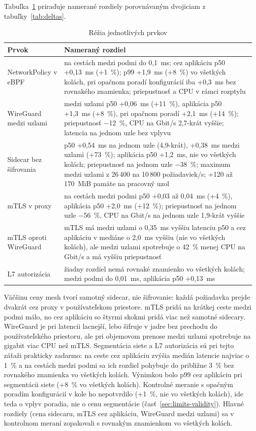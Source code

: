 Tabuľka~\ref{tab:deltas-measured} priraďuje namerané rozdiely porovnávaným dvojiciam z tabuľky~\ref{tab:deltas}.

\begin{table}[ht!]
  \centering
  \caption{Réžia jednotlivých prvkov}
  \label{tab:deltas-measured}
  \footnotesize
  \renewcommand{\arraystretch}{1.15}
  \begin{tabularx}{\textwidth}{@{}>{\raggedright\arraybackslash}p{3.6cm}>{\raggedright\arraybackslash}X@{}}
    \toprule
    Prvok & Nameraný rozdiel \\
    \midrule
    NetworkPolicy v eBPF & na cestách medzi podmi do 0,1~ms; cez aplikáciu p50 +0,13~ms (+1~\%); p99 +1,9~ms (+8~\%) vo všetkých kolách, pri opačnom poradí konfigurácií iba +0,3~ms bez rovnakého znamienka; priepustnosť a CPU v rámci rozptylu \\
    WireGuard medzi uzlami & medzi uzlami p50 +0,06~ms (+11~\%), aplikácia p50 +1,3~ms (+8~\%), pri opačnom poradí +2,1~ms (+14~\%); priepustnosť $-$12~\%, CPU na Gbit/s 2,7-krát vyššie; latencia na jednom uzle bez vplyvu \\
    Sidecar bez šifrovania & p50 +0,54~ms na jednom uzle (4,9-krát), +0,38~ms medzi uzlami (+73~\%); aplikácia p50 +1,2~ms, nie vo všetkých kolách; priepustnosť na jednom uzle $-$38~\%; maximum medzi uzlami z 26\,400 na 10\,800 požiadaviek/s; +120 až 170~MiB pamäte na pracovný uzol \\
    mTLS v proxy & na cestách medzi podmi p50 +0,03 až 0,04~ms (+4~\%), aplikácia p50 +2,0~ms (+12~\%); priepustnosť na jednom uzle $-$56~\%, CPU na Gbit/s na jednom uzle 1,9-krát vyššie \\
    mTLS oproti WireGuard & mTLS má medzi uzlami o 0,35~ms vyššiu latenciu p50 a cez aplikáciu v mediáne o 2,0~ms vyššiu (nie vo všetkých kolách), ale medzi uzlami spotrebuje o 42~\% menej CPU na Gbit/s a má vyššiu priepustnosť \\
    L7 autorizácia & žiadny rozdiel nemá rovnaké znamienko vo všetkých kolách; medzi podmi do 0,01~ms, aplikácia p50 +0,13~ms \\
    \bottomrule
  \end{tabularx}
\end{table}

Väčšinu ceny mesh tvorí samotný sidecar, nie šifrovanie: každá požiadavka prejde dvakrát cez proxy v používateľskom priestore. mTLS pridá na krátkej ceste medzi podmi málo, no cez aplikáciu so štyrmi skokmi pridá viac než samotné sidecary. WireGuard je pri latencii lacnejší, lebo šifruje v jadre bez prechodu do používateľského priestoru, ale pri objemovom prenose medzi uzlami spotrebuje na gigabit viac CPU než mTLS. Segmentácia siete a L7 autorizácia sú pri tejto záťaži prakticky zadarmo: na ceste cez aplikáciu zvýšia medián latencie najviac o 1~\% a na cestách medzi podmi sa ich rozdiel pohybuje do približne 3~\% bez rovnakého znamienka vo všetkých kolách. Výnimkou bolo p99 cez aplikáciu pri segmentácii siete (+8~\% vo všetkých kolách). Kontrolné meranie s opačným poradím konfigurácií v kole ho nepotvrdilo (+1~\%, nie vo všetkých kolách), ide teda o vplyv poradia, nie o cenu segmentácie (časť~\ref{sec:limits-validity}). Hlavné rozdiely (cena sidecaru, mTLS cez aplikáciu, WireGuard medzi uzlami) sa v kontrolnom meraní zopakovali s rovnakým znamienkom vo všetkých kolách.
